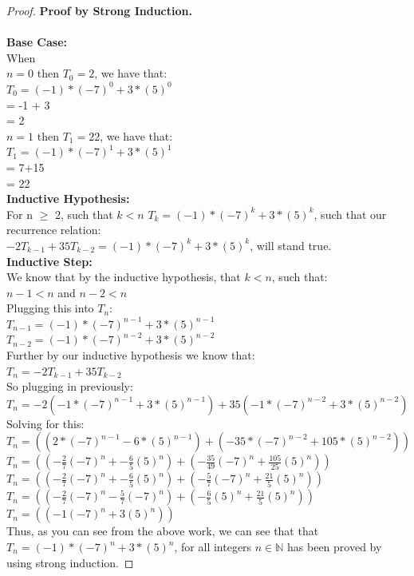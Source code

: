 \documentclass[11pt]{article}
\theoremstyle{definition}
\theoremstyle{definition}
\theoremstyle{definition}
\begin{document}
\begin{proof} \textbf{Proof by Strong Induction.}\\\\
\textbf {Base Case:} \\ 
When \\
\indent $n = 0$ then $T_0 = 2$, we have that:\\ 
\indent\indent$T_0 = (-1)*(-7)^0 + 3*(5)^0$ \\
\indent\indent\indent= -1 + 3 \\
\indent\indent{} = 2 \\
\indent $n = 1$ then $T_1 = 22$, we have that: \\
\indent\indent$T_1 = (-1)*(-7)^1 + 3*(5)^1$\\
\indent\indent= 7+15 \\
\indent\indent{} = 22\\

\textbf{Inductive Hypothesis:} \\

For n $\ge$ 2, such that $k < n$ $T_k = (-1)*(-7)^k + 3*(5)^k$, such that our recurrence relation: \\
\indent $-2T_{k-1} + 35T_{k-2} = (-1)*(-7)^k + 3*(5)^k$, will stand true.\\

\textbf{Inductive Step:}\\
We know that by the inductive hypothesis, that $k < n$, such that: \\
\indent $n-1 < n$ and $n-2 < n$ \\
Plugging this into $T_n$: \\
\indent$T_{n-1} = (-1) * (-7)^{n-1} + 3 * (5)^{n-1}$\\
\indent$T_{n-2} = (-1) * (-7)^{n-2} + 3 * (5)^{n-2}$ \\
Further by our inductive hypothesis we know that: \\ 
\indent$T_n = -2T_{k-1} + 35T_{k-2}$ \\
So plugging in previously: \\
\indent $T_n = -2(-1*(-7)^{n-1} + 3*(5)^{n-1}) + 35(-1*(-7)^{n-2} + 3*(5)^{n-2})$\\
Solving for this: \\
\indent$T_n = ((2*(-7)^{n-1} - 6*(5)^{n-1}) + (-35*(-7)^{n-2} + 105*(5)^{n-2}))$ \\
\indent $T_n = ((-\frac{2}{7}(-7)^n + -\frac {6}{5}(5)^n) + (-\frac{35}{49}(-7)^n + \frac{105}{25}(5)^n))$ \\
\indent  $T_n = ((-\frac{2}{7}(-7)^n + -\frac {6}{5}(5)^n) + (-\frac{5}{7}(-7)^n + \frac{21}{5}(5)^n))$ \\
\indent $T_n = ((-\frac{2}{7}(-7)^n  - \frac{5}{7}(-7)^n) + (-\frac {6}{5}(5)^n + \frac{21}{5}(5)^n))$ \\
\indent $T_n = ((-1(-7)^n + 3(5)^n))$ \\
Thus, as you can see from the above work, we can see that that $T_{n} = (-1) * (-7)^{n} + 3 * (5)^{n}$, for all integers $n \in \mathbb{N}$ has been proved by using strong induction.
\end{proof}
\end{document}
